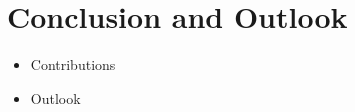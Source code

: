 \section{Conclusion and Outlook}
\label{sec:conclusion}

\begin{itemize}
	\item Contributions
	\item Outlook
\end{itemize}
